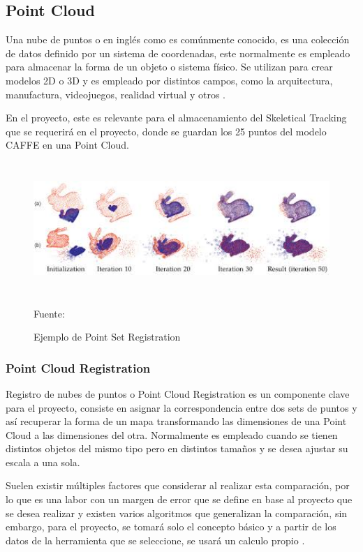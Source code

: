 \subsection{Point Cloud}

Una nube de puntos o en inglés como es comúnmente conocido, es una colección de datos definido por un sistema de coordenadas, este normalmente es empleado para almacenar la forma de un objeto o sistema físico. Se utilizan para crear modelos 2D o 3D y es empleado por distintos campos, como la arquitectura, manufactura, videojuegos, realidad virtual y otros \cite{pointcloud}.

En el proyecto, este es relevante para el almacenamiento del Skeletical Tracking que se requerirá en el proyecto, donde se guardan los 25 puntos del modelo CAFFE en una Point Cloud.

\begin{figure}[t!]
	\centering
	\includegraphics[width=15cm,height=5cm,]{./Images/driftexample.jpg}
	\caption{Ejemplo de Point Set Registration}
	\footnotesize Fuente: \cite{ravikumar2017generalised}
	\label{pointdriftexample}
\end{figure}

\subsubsection{Point Cloud Registration}

Registro de nubes de puntos o Point Cloud Registration es un componente clave para el proyecto, consiste en asignar la correspondencia entre dos sets de puntos y así recuperar la forma de un mapa transformando las dimensiones de una Point Cloud a las dimensiones del otra. Normalmente es empleado cuando se tienen distintos objetos del mismo tipo pero en distintos tamaños y se desea ajustar su escala a una sola.

Suelen existir múltiples factores que considerar al realizar esta comparación, por lo que es una labor con un margen de error que se define en base al proyecto que se desea realizar y existen varios algoritmos que generalizan la comparación, sin embargo, para el proyecto, se tomará solo el concepto básico y a partir de los datos de la herramienta que se seleccione, se usará un calculo propio \cite{myronenko2010point}.


